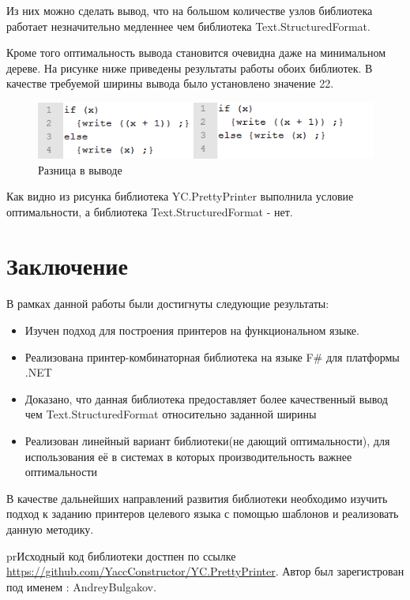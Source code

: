 \documentclass{matmex-diploma}
\begin{document}
Из них можно сделать вывод, что на большом количестве узлов библиотека  работает незначительно медленнее чем библиотека Text.StructuredFormat.

Кроме того оптимальность вывода становится очевидна даже на минимальном дереве. На рисунке ниже приведены результаты работы обоих библиотек. В качестве требуемой ширины вывода было установлено значение 22.
\par
\begin{figure}[h]
    \centering
	\includegraphics{Images/image00.png}
	\caption{Разница в выводе}
\end{figure}
\par
Как видно из рисунка  библиотека YC.PrettyPrinter выполнила условие оптимальности, а библиотека Text.StructuredFormat - нет.
\section{Заключение}
В рамках данной работы были достигнуты следующие результаты:
\begin{itemize}
    \item Изучен подход для построения принтеров на функциональном языке.
    \item Реализована принтер-комбинаторная библиотека на языке F\# для платформы .NET
    \item Доказано, что данная библиотека предоставляет более качественный вывод чем Text.StructuredFormat  относительно заданной ширины
    \item Реализован линейный вариант библиотеки(не дающий оптимальности), для использования её в системах в которых производительность важнее оптимальности
\end{itemize}
В качестве дальнейших направлений развития библиотеки необходимо изучить подход к заданию принтеров целевого языка с помощью шаблонов и реализовать данную методику.

prИсходный код библиотеки достпен по ссылке \sloppy\url{https://github.com/YaccConstructor/YC.PrettyPrinter}. Автор был зарегистрован под именем : AndreyBulgakov.


\end{document}
